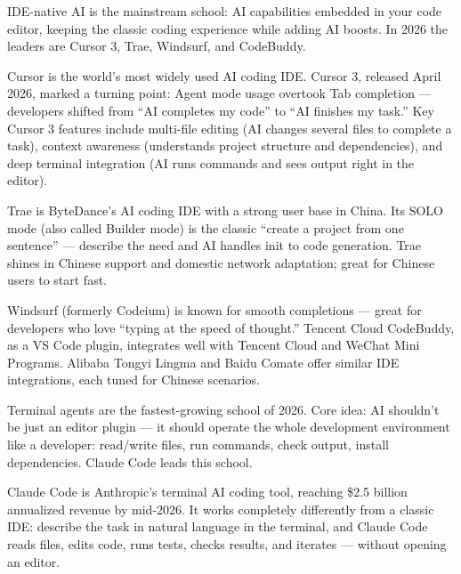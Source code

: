 
IDE-native AI is the mainstream school: AI capabilities embedded in your code editor, keeping the classic coding experience while adding AI boosts. In 2026 the leaders are Cursor 3, Trae, Windsurf, and CodeBuddy.


Cursor is the world's most widely used AI coding IDE. Cursor 3, released April 2026, marked a turning point: Agent mode usage overtook Tab completion — developers shifted from “AI completes my code” to “AI finishes my task.” Key Cursor 3 features include multi-file editing (AI changes several files to complete a task), context awareness (understands project structure and dependencies), and deep terminal integration (AI runs commands and sees output right in the editor).


Trae is ByteDance's AI coding IDE with a strong user base in China. Its SOLO mode (also called Builder mode) is the classic “create a project from one sentence” — describe the need and AI handles init to code generation. Trae shines in Chinese support and domestic network adaptation; great for Chinese users to start fast.


Windsurf (formerly Codeium) is known for smooth completions — great for developers who love “typing at the speed of thought.” Tencent Cloud CodeBuddy, as a VS Code plugin, integrates well with Tencent Cloud and WeChat Mini Programs. Alibaba Tongyi Lingma and Baidu Comate offer similar IDE integrations, each tuned for Chinese scenarios.


Terminal agents are the fastest-growing school of 2026. Core idea: AI shouldn't be just an editor plugin — it should operate the whole development environment like a developer: read/write files, run commands, check output, install dependencies. Claude Code leads this school.


Claude Code is Anthropic's terminal AI coding tool, reaching \$2.5 billion annualized revenue by mid-2026. It works completely differently from a classic IDE: describe the task in natural language in the terminal, and Claude Code reads files, edits code, runs tests, checks results, and iterates — without opening an editor.

